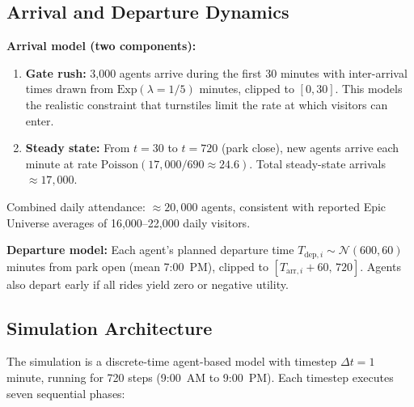 \documentclass[11pt]{article}
\begin{document}
\subsection{Arrival and Departure Dynamics}

\textbf{Arrival model (two components):}

\begin{enumerate}[nosep]
    \item \textbf{Gate rush:} 3,000 agents arrive during the first 30 minutes with inter-arrival times drawn from $\text{Exp}(\lambda = 1/5)$ minutes, clipped to $[0, 30]$. This models the realistic constraint that turnstiles limit the rate at which visitors can enter.
    \item \textbf{Steady state:} From $t = 30$ to $t = 720$ (park close), new agents arrive each minute at rate $\text{Poisson}(17{,}000 / 690 \approx 24.6)$. Total steady-state arrivals $\approx 17{,}000$.
\end{enumerate}

Combined daily attendance: $\approx 20{,}000$ agents, consistent with reported Epic Universe averages of 16,000--22,000 daily visitors.

\textbf{Departure model:} Each agent's planned departure time $T_{\text{dep},i} \sim \mathcal{N}(600, 60)$ minutes from park open (mean 7:00~PM), clipped to $[T_{\text{arr},i} + 60,\, 720]$. Agents also depart early if all rides yield zero or negative utility.

\subsection{Simulation Architecture}

The simulation is a discrete-time agent-based model with timestep $\Delta t = 1$ minute, running for 720 steps (9:00~AM to 9:00~PM). Each timestep executes seven sequential phases:
\end{document}
